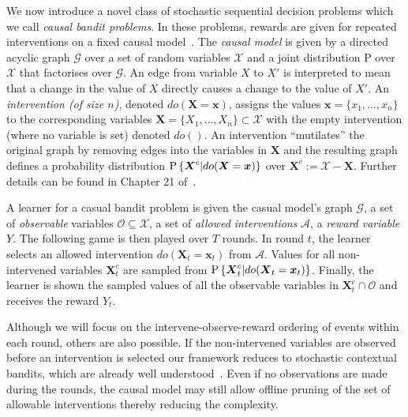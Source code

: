 \newcommand{\bernoulli}{\operatorname{Bernoulli}}
\newcommand{\dirac}{\operatorname{Dirac}}
\renewcommand{\vec}[1]{\boldsymbol{#1}}

We now introduce a novel class of stochastic sequential decision problems which we call \emph{causal bandit problems}. 
In these problems, rewards are given for repeated interventions on a fixed causal model~\cite{Pearl2000}. 
The \emph{causal model} is given by a directed acyclic graph $\mathcal{G}$ over a set of random variables $\mathcal{X}$ and a joint distribution $\mathrm{P}$ over $\mathcal{X}$ that factorises over $\mathcal{G}$. 
An edge from variable $X$ to $X'$ is interpreted to mean that a change in the value of $X$ directly causes a change to the value of $X'$. 
An \emph{intervention (of size $n$)}, denoted $do(\vec{X}=\vec{x})$, assigns the values $\vec{x}=\{x_1, \ldots, x_n\}$ to the corresponding variables $\vec{X}=\{X_1, \ldots, X_n\} \subset \mathcal{X}$ with the empty intervention (where no variable is set) denoted $do()$.
An intervention ``mutilates'' the original graph by removing edges into the variables in $\vec{X}$ and the resulting graph defines a probability distribution $\P{\vec{X}^c | do(\vec{X}=\vec{x})}$ over $\vec{X}^c := \mathcal{X} - \vec{X}$. 
Further details can be found in Chapter 21 of~\cite{Koller2009}.

A learner for a casual bandit problem is given the casual model's graph $\mathcal{G}$, a set of \emph{observable} variables $\mathcal{O} \subseteq \mathcal{X}$, a set of \emph{allowed interventions} $\mathcal{A}$, a \emph{reward variable} $Y$. 
The following game is then played over $T$ rounds.
In round $t$, the learner selects an allowed intervention $do(\vec{X}_t = \vec{x}_t)$ from $\mathcal{A}$.
Values for all non-intervened variables $\vec{X}^c_t$ are sampled from $\P{\vec{X}^c_t | do(\vec{X}_t = \vec{x}_t)}$. Finally, the learner is shown the sampled values of all the observable variables in $\vec{X}^c_t \cap \mathcal{O}$ and receives the reward $Y_t$.

Although we will focus on the intervene-observe-reward ordering of events within each round, others are also possible. 
If the non-intervened variables are observed before an intervention is selected our framework reduces to stochastic contextual bandits, which are already well understood~\citep{Agarwal2014}. 
Even if no observations are made during the rounds, the causal model may still allow offline pruning of the set of allowable interventions thereby reducing the complexity.

